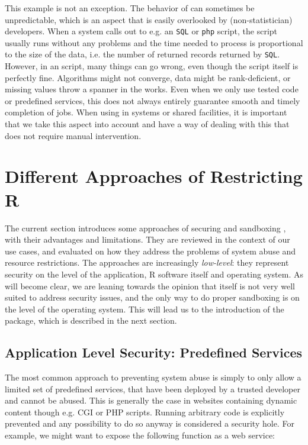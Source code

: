 \documentclass[article]{jss}
\begin{document}
This example is not an exception. The behavior of  can sometimes be
unpredictable, which is an aspect that is easily overlooked by
(non-statistician) developers. When a system calls out to e.g. an \texttt{SQL}
or \texttt{php} script, the script usually runs without any problems and the
time needed to process is proportional to the size of the data, i.e. the number
of returned records returned by \texttt{SQL}. However, in an 
script, many things can go wrong, even though the script itself is perfectly
fine. Algorithms might not converge, data might be rank-deficient, or missing
values throw a spanner in the works. Even when we only use tested code or
predefined services, this does not always entirely guarantee smooth and timely
completion of  jobs. When using  in systems or shared
facilities, it is important that we take this aspect into account and have a
way of dealing with this that does not require manual intervention.

\section{Different Approaches of Restricting R}

The current section introduces some approaches of securing and sandboxing
, with their advantages and limitations. They are reviewed in the
context of our use cases, and evaluated on how they address the problems of
system abuse and resource restrictions. The approaches are increasingly
\emph{low-level}: they represent security on the level of the application, R
software itself and operating system. As will become clear, we are leaning
towards the opinion that  itself is not very well suited to address
security issues, and the only way to do proper sandboxing is on the level of the
operating system. This will lead us to the introduction of the 
package, which is described in the next section.


\subsection{Application Level Security: Predefined Services}

The most common approach to preventing system abuse is simply to only allow a
limited set of predefined services, that have been deployed by a trusted
developer and cannot be abused. This is generally the case in websites
containing dynamic content though e.g. CGI or PHP scripts. Running arbitrary
code is explicitly prevented and any possibility to do so anyway is considered
a security hole. For example, we might want to expose the following function as
a web service:
\end{document}
